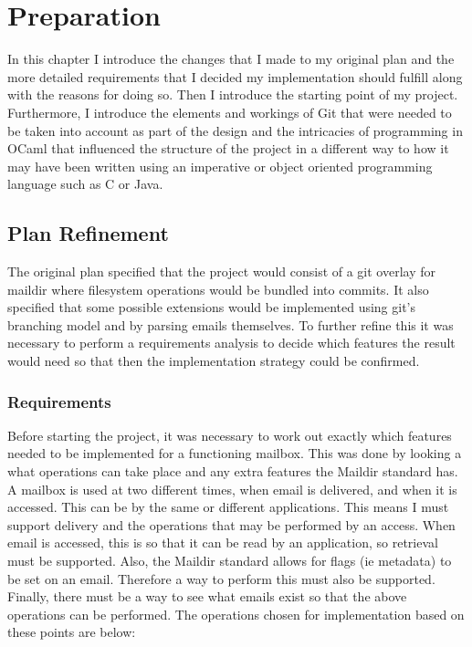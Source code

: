 \chapter{Preparation}

In this chapter I introduce the changes that I made to my original plan and the more detailed requirements that I decided my implementation should fulfill along with the reasons for doing so. Then I introduce the starting point of my project. Furthermore, I introduce the elements and workings of Git that were needed to be taken into account as part of the design and the intricacies of programming in OCaml that influenced the structure of the project in a different way to how it may have been written using an imperative or object oriented programming language such as C or Java.

\section{Plan Refinement}

The original plan specified that the project would consist of a git overlay for maildir where filesystem operations would be bundled into commits. It also specified that some possible extensions would be implemented using git's branching model and by parsing emails themselves. To further refine this it was necessary to perform a requirements analysis to decide which features the result would need so that then the implementation strategy could be confirmed.

\subsection{Requirements}

Before starting the project, it was necessary to work out exactly which features needed to be implemented for a functioning mailbox. This was done by looking a what operations can take place and any extra features the Maildir standard has. A mailbox is used at two different times, when email is delivered, and when it is accessed. This can be by the same or different applications. This means I must support delivery and the operations that may be performed by an access. When email is accessed, this is so that it can be read by an application, so retrieval must be supported. Also, the Maildir standard allows for flags (ie metadata) to be set on an email. Therefore a way to perform this must also be supported. Finally, there must be a way to see what emails exist so that the above operations can be performed. The operations chosen for implementation based on these points are below:

